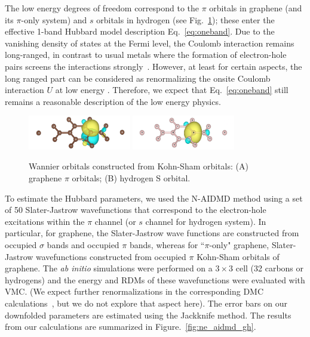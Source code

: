 The low energy degrees of freedom correspond to the $\pi$ orbitals in graphene (and its $\pi$-only system) 
and $s$ orbitals in hydrogen (see Fig.~\ref{fig:honeycomb_wan}); these enter the effective 
1-band Hubbard model description Eq.~\eqref{eq:oneband}. Due to the vanishing density of states at 
the Fermi level, the Coulomb interaction remains long-ranged, in contrast to usual 
metals where the formation of electron-hole pairs screens the interactions strongly~\cite{Zheng2016}. 
However, at least for certain aspects, the long ranged part can be considered as renormalizing the 
onsite Coulomb interaction $U$ at low energy \cite{Schuler2013, Changlani2015}. 
Therefore, we expect that Eq.~\eqref{eq:oneband} still remains a reasonable description of the low energy physics. 
\begin{figure}[hbt]
\centering
\includegraphics[width=0.40\textwidth]{./Figures/c_pi.png}
\includegraphics[width=0.40\textwidth]{./Figures/h_wan.png}
\caption{Wannier orbitals constructed from Kohn-Sham orbitals: (A) graphene $\pi$ orbitals; (B) hydrogen S orbital. }
\label{fig:honeycomb_wan}
\end{figure}

To estimate the Hubbard parameters, we used the N-AIDMD method using a set of 50 Slater-Jastrow wavefunctions that correspond 
to the electron-hole excitations within the $\pi$ channel (or $s$ channel for hydrogen system). In particular, for graphene, 
the Slater-Jastrow wave functions are constructed from occupied $\sigma$ bands and occupied $\pi$ bands, whereas for ``$\pi$-only" graphene, 
Slater-Jastrow wavefunctions constructed from occupied $\pi$ Kohn-Sham orbitals of graphene. The \textit{ab initio} simulations 
were performed on a $3\times3$ cell (32 carbons or hydrogens) and the energy and RDMs of these wavefunctions were
evaluated with VMC. (We expect further renormalizations in the corresponding DMC calculations~\cite{Changlani2015}, 
but we do not explore that aspect here). The error bars on our downfolded parameters are estimated using the Jackknife method. 
The results from our calculations are summarized in %
Figure.~\ref{fig:ne_aidmd_gh}.%

